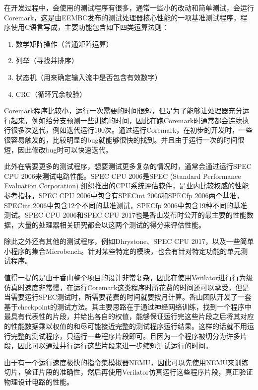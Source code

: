 在开发过程中，会使用的测试程序有很多，通常一些小的改动和简单测试，会运行Coremark，这是由EEMBC发布的测试处理器核心性能的一项基准测试程序，程序使用C语言写成，主要功能包含如下四类运算法则：

\begin{enumerate}
	\item 数学矩阵操作（普通矩阵运算）
	\item 列举（寻找并排序）
	\item 状态机（用来确定输入流中是否包含有效数字）
	\item CRC（循环冗余校验）
\end{enumerate}

Coremark程序比较小，运行一次需要的时间很短，但是为了能够让处理器充分运行起来，例如给分支预测一些训练的时间，因此在跑Coremark时通常都会连续执行很多次迭代，例如迭代运行100次。通过运行Coremark，在初步的开发时，一些很容易触发的，比较明显的bug就能够很快的找到。并且由于运行一次的时间很短，因此修改bug时可以快速迭代。

此外在需要更多的测试程序，想要测试更多复杂的情况时，通常会通过运行SPEC CPU 2006\cite{spec-2006}来测试电路性能。SPEC CPU 2006是SPEC (Standard Performance Evaluation Corporation) 组织推出的CPU系统评估软件，是业内比较权威的性能参考指标，SPEC CPU 2006中包含有SPECint 2006和SPECfp 2006两个基准，SPECint 2006中包含12个不同的基准测试，SPECfp 2006中包含19种不同的基准测试。SPEC CPU 2006和SPEC CPU 2017也是香山发布时公开的最主要的性能数据，大量的处理器相关研究都会以这两个测试的得分来评估性能。

除此之外还有其他的测试程序，例如Dhrystone\cite{dhrystone}、SPEC CPU 2017，以及一些简单小程序的集合Microbench。针对某些特定的模块，也会有针对特定功能的单元测试程序。


值得一提的是由于香山整个项目的设计非常复杂，因此在使用Verilator进行行为级仿真时速度非常慢，在运行Coremark这类程序时所花费的时间还可以承受，但是当需要运行SPEC测试时，所需要花费的时间就要按月计算。香山团队开发了一套基于checkpoint的测试方法。其主要思路在于通过神经网络训练，找到一个程序中最具有代表性的片段，并给出各自的权值，能够保证运行完这些片段之后将其对应的性能数据乘以权值的和尽可能接近完整的测试程序运行结果。这样的话就不用运行完整的测试程序，只运行一些程序片段即可。且因为一个程序被切分为许多片段，因此可以通过并行运行这些片段来进一步缩短测试运行的时间。

由于有一个运行速度极快的指令集模拟器NEMU，因此可以先使用NEMU来训练切片，验证片段的准确性，然后再使用Verilator仿真运行这些程序片段，真正验证物理设计电路的性能。

